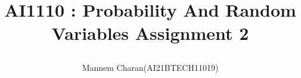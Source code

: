 \documentclass[journal,12pt,twocolumn]{IEEEtran}
\begin{document}
	\let\StandardTheFigure\thefigure
	\let\vec\mathbf
	
		
		
		
		\def\putbox#1#2#3{\makebox[0in][l]{\makebox[#1][l]{}\raisebox{\baselineskip}[0in][0in]{\raisebox{#2}[0in][0in]{#3}}}}
		\def\rightbox#1{\makebox[0in][r]{#1}}
		\def\centbox#1{\makebox[0in]{#1}}
		\def\topbox#1{\raisebox{-\baselineskip}[0in][0in]{#1}}
		\def\midbox#1{\raisebox{-0.5\baselineskip}[0in][0in]{#1}}
	
		
		\title{
			AI1110 : Probability And Random Variables
                                     Assignment 2 
                        
		}
		\author{ 
		            Mannem Charan(AI21BTECH11019)
		}	
		
		
		
\end{document}
